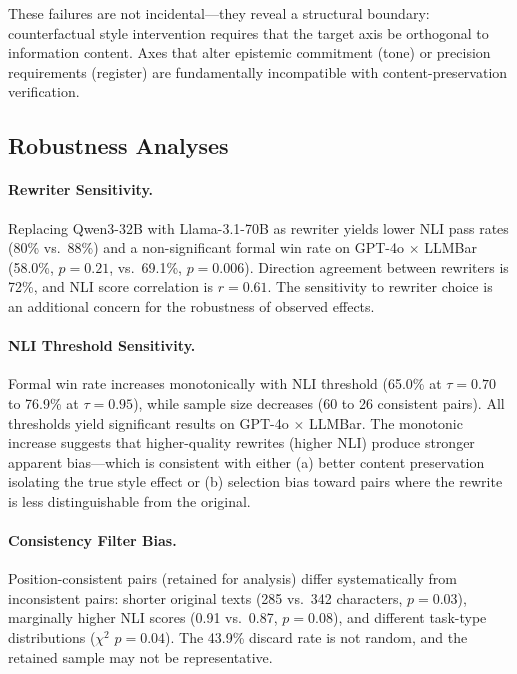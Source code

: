 \documentclass[11pt,a4paper]{article}
\begin{document}
These failures are not incidental---they reveal a structural boundary: counterfactual style intervention requires that the target axis be orthogonal to information content. Axes that alter epistemic commitment (tone) or precision requirements (register) are fundamentally incompatible with content-preservation verification.

\subsection{Robustness Analyses}
\label{sec:robustness}

\paragraph{Rewriter Sensitivity.} Replacing Qwen3-32B with Llama-3.1-70B as rewriter yields lower NLI pass rates (80\% vs.\ 88\%) and a non-significant formal win rate on GPT-4o $\times$ LLMBar (58.0\%, $p=0.21$, vs.\ 69.1\%, $p=0.006$). Direction agreement between rewriters is 72\%, and NLI score correlation is $r=0.61$. The sensitivity to rewriter choice is an additional concern for the robustness of observed effects.

\paragraph{NLI Threshold Sensitivity.} Formal win rate increases monotonically with NLI threshold (65.0\% at $\tau=0.70$ to 76.9\% at $\tau=0.95$), while sample size decreases (60 to 26 consistent pairs). All thresholds yield significant results on GPT-4o $\times$ LLMBar. The monotonic increase suggests that higher-quality rewrites (higher NLI) produce stronger apparent bias---which is consistent with either (a) better content preservation isolating the true style effect or (b) selection bias toward pairs where the rewrite is less distinguishable from the original.

\paragraph{Consistency Filter Bias.} Position-consistent pairs (retained for analysis) differ systematically from inconsistent pairs: shorter original texts (285 vs.\ 342 characters, $p=0.03$), marginally higher NLI scores (0.91 vs.\ 0.87, $p=0.08$), and different task-type distributions ($\chi^2$ $p=0.04$). The 43.9\% discard rate is not random, and the retained sample may not be representative.
\end{document}
